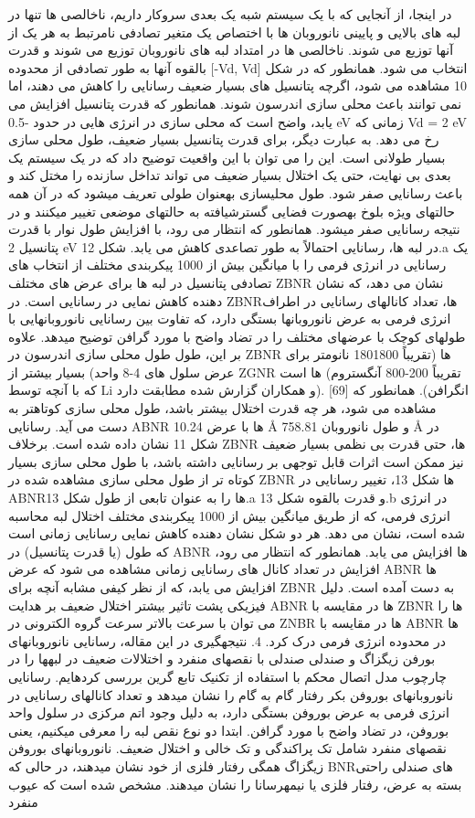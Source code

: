 در اینجا، از آنجایی که با یک سیستم شبه یک بعدی سروکار داریم، ناخالصی ها تنها در لبه های بالایی و پایینی نانوروبان ها با اختصاص یک متغیر تصادفی نامرتبط به هر یک از آنها توزیع می شوند. ناخالصی ها در امتداد لبه های نانوروبان توزیع می شوند و قدرت بالقوه آنها به طور تصادفی از محدوده [-Vd, Vd] انتخاب می شود. همانطور که در شکل 10 مشاهده می شود، اگرچه پتانسیل های بسیار ضعیف رسانایی را کاهش می دهند، اما نمی توانند باعث محلی سازی اندرسون شوند. همانطور که قدرت پتانسیل افزایش می یابد، واضح است که محلی سازی در انرژی هایی در حدود -0.5 eV زمانی که Vd = 2 eV رخ می دهد. به عبارت دیگر، برای قدرت پتانسیل بسیار ضعیف، طول محلی سازی بسیار طولانی است. این را می توان با این واقعیت توضیح داد که در یک سیستم یک بعدی بی نهایت، حتی یک اختلال بسیار ضعیف می تواند تداخل سازنده را مختل کند و باعث رسانایی صفر شود. طول محلیسازی بهعنوان طولی تعریف میشود که در آن همه حالتهای ویژه بلوخ بهصورت فضایی گسترشیافته به حالتهای موضعی تغییر میکنند و در نتیجه رسانایی صفر میشود. همانطور که انتظار می رود، با افزایش طول نوار با قدرت پتانسیل 2 eV در لبه ها، رسانایی احتمالاً به طور تصاعدی کاهش می یابد. شکل 12.a یک رسانایی در انرژی فرمی را با میانگین بیش از 1000 پیکربندی مختلف از انتخاب های تصادفی پتانسیل در لبه ها برای عرض های مختلف ZBNR نشان می دهد، که نشان دهنده کاهش نمایی در رسانایی است. در ZBNRها، تعداد کانالهای رسانایی در اطراف انرژی فرمی به عرض نانوروبانها بستگی دارد، که تفاوت بین رسانایی نانوروبانهایی با طولهای کوچک با عرضهای مختلف را در تضاد واضح با مورد گرافن توضیح میدهد. علاوه بر این، طول طول محلی سازی اندرسون در ZBNR ها (تقریباً 1801800 نانومتر برای عرض سلول های 4-8 واحد) بسیار بیشتر از ZGNR ها است (تقریباً 200-800 آنگستروم که با آنچه توسط Li و همکاران گزارش شده مطابقت دارد). [69] انگرافن). همانطور که مشاهده می شود، هر چه قدرت اختلال بیشتر باشد، طول محلی سازی کوتاهتر به دست می آید. رسانایی ABNR ها با عرض 10.24 Å و طول نانوروبان 758.81 Å در شکل 11 نشان داده شده است. برخلاف ZBNR ها، حتی قدرت بی نظمی بسیار ضعیف نیز ممکن است اثرات قابل توجهی بر رسانایی داشته باشد، با طول محلی سازی بسیار کوتاه تر از طول محلی سازی مشاهده شده در ZBNR ها شکل 13، تغییر رسانایی در ABNRها را به عنوان تابعی از طول شکل 13.a و قدرت بالقوه شکل 13.b در انرژی انرژی فرمی، که از طریق میانگین بیش از 1000 پیکربندی مختلف اختلال لبه محاسبه شده است، نشان می دهد. هر دو شکل نشان دهنده کاهش نمایی رسانایی زمانی است که طول (یا قدرت پتانسیل) در ABNR ها افزایش می یابد. همانطور که انتظار می رود، افزایش در تعداد کانال های رسانایی زمانی مشاهده می شود که عرض ABNR ها افزایش می یابد، که از نظر کیفی مشابه آنچه برای ZBNR به دست آمده است. دلیل فیزیکی پشت تاثیر بیشتر اختلال ضعیف بر هدایت ABNR ها در مقایسه با ZBNR ها را می توان با سرعت بالاتر سرعت گروه الکترونی در ZNBR ها در مقایسه با ABNR ها در محدوده انرژی فرمی درک کرد. 4. نتیجهگیری در این مقاله، رسانایی نانوروبانهای بورفن زیگزاگ و صندلی صندلی با نقصهای منفرد و اختلالات ضعیف در لبهها را در چارچوب مدل اتصال محکم با استفاده از تکنیک تابع گرین بررسی کردهایم. رسانایی نانوروبانهای بوروفن بکر رفتار گام به گام را نشان میدهد و تعداد کانالهای رسانایی در انرژی فرمی به عرض بوروفن بستگی دارد، به دلیل وجود اتم مرکزی در سلول واحد بوروفن، در تضاد واضح با مورد گرافن. ابتدا دو نوع نقص لبه را معرفی میکنیم، یعنی نقصهای منفرد شامل تک پراکندگی و تک خالی و اختلال ضعیف. نانوروبانهای بوروفن زیگزاگ همگی رفتار فلزی از خود نشان میدهند، در حالی که BNRهای صندلی راحتی بسته به عرض، رفتار فلزی یا نیمهرسانا را نشان میدهند. مشخص شده است که عیوب منفرد 